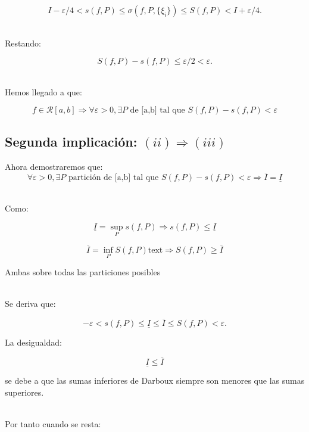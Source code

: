 \documentclass[a4paper,12pt]{article}
\begin{document}
	
	
	\[
	I - \varepsilon/4 < s(f, P) \leq \sigma(f, P, \{\xi_i\}) \leq S(f, P) < I + \varepsilon/4.
	\]
	
	\quad \\
	
	Restando:
	
	
	
	\[
	S(f, P) - s(f, P) \leq \varepsilon/2 < \varepsilon.
	\]
	
	\quad \\
	
	Hemos llegado a que:
	
	\[
	f \in \mathcal{R}[a,b] \Rightarrow \forall \varepsilon > 0,     \exists P \text{ de [a,b] tal que  }   S(f,P) - s(f,P) < \varepsilon
	\]
	\subsection{Segunda implicación: $ (ii) \Rightarrow (iii) $ }
	
	
	Ahora demostraremos que:
	\[
	\forall \varepsilon > 0, \exists P \text{ partición de [a,b] tal que }  S(f,P) - s(f,P) < \varepsilon \Rightarrow \overline{I} = \underline{I}
	\]
	
	\quad \\
	
	Como:
	
	
	
	\[
	\underline{I} = \sup_P s(f, P) \Longrightarrow s(f,P) \leq \underline{I}   
	\]
	
	\[
	\overline{I} = \inf_P S(f, P) \text{text} \Longrightarrow S(f,P) \geq \overline{I}
	\]
	
	Ambas sobre todas las particiones posibles
	
	\quad \\
	
	Se deriva que:
	
	
	
	\[
	- \varepsilon < s(f, P) \leq \underline{I} \leq \overline{I} \leq S(f, P) < \varepsilon.
	\]
	
	La desigualdad:
	
	\[
	 \underline{I} \leq \overline{I}
	\]
	
	se debe a que las sumas inferiores de Darboux siempre son menores que las sumas superiores.
	
	\quad \\
	
	Por tanto cuando se resta:
	
	
	
\end{document}
